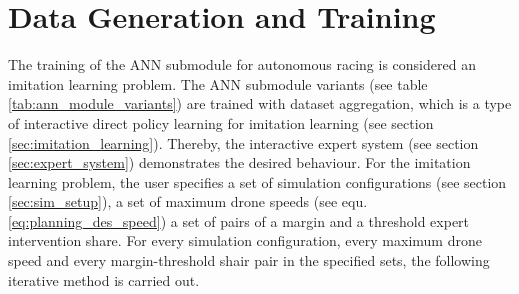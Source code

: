 \section{Data Generation and Training} \label{sec:training}
The training of the ANN submodule
for autonomous racing is considered 
an imitation learning problem.
The ANN submodule variants
(see table \ref{tab:ann_module_variants})
are trained with dataset aggregation,
which is a type of interactive direct policy learning
for imitation learning (see section \ref{sec:imitation_learning}).
Thereby, the interactive expert system (see section \ref{sec:expert_system})
demonstrates the desired behaviour.
For the imitation learning problem,
the user specifies a set of 
simulation configurations (see section \ref{sec:sim_setup}),
a set of maximum drone speeds (see equ. \ref{eq:planning_des_speed})
a set of pairs of a margin and a threshold expert intervention share.
For every simulation configuration,
every maximum drone speed 
and every margin-threshold shair pair in the specified sets,
the following iterative method is carried out.
